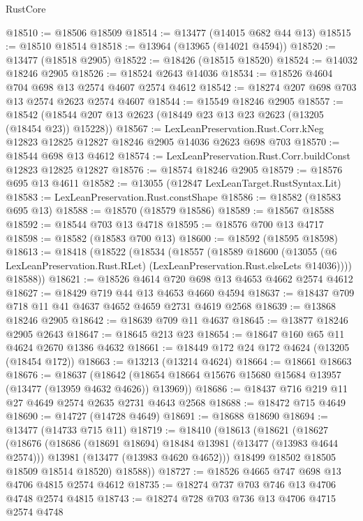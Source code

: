 \begin{lexlean}{RustCore}
\begin{coremodule}
@18510 := @18506 @18509
@18514 := @13477 (@14015 @682 @44 @13)
@18515 := @18510 @18514
@18518 := @13964 (@13965 (@14021 @4594))
@18520 := @13477 (@18518 @2905)
@18522 := @18426 (@18515 @18520)
@18524 := @14032 @18246 @2905
@18526 := @18524 @2643 @14036
@18534 := @18526 @4604 @704 @698 @13 @2574 @4607 @2574 @4612
@18542 := @18274 @207 @698 @703 @13 @2574 @2623 @2574 @4607
@18544 := @15549 @18246 @2905
@18557 := @18542 (@18544 @207 @13 @2623 (@18449 @23 @13 @23 @2623 (@13205 (@18454 @23)) @15228))
@18567 := LexLeanPreservation.Rust.Corr.kNeg
    @12823
    @12825
    @12827
    @18246
    @2905
    @14036
    @2623
    @698
    @703
@18570 := @18544 @698 @13 @4612
@18574 := LexLeanPreservation.Rust.Corr.buildConst @12823 @12825 @12827
@18576 := @18574 @18246 @2905
@18579 := @18576 @695 @13 @4611
@18582 := @13055 (@12847 LexLeanTarget.RustSyntax.Lit)
@18583 := LexLeanPreservation.Rust.constShape
@18586 := @18582 (@18583 @695 @13)
@18588 := @18570 (@18579 @18586)
@18589 := @18567 @18588
@18592 := @18544 @703 @13 @4718
@18595 := @18576 @700 @13 @4717
@18598 := @18582 (@18583 @700 @13)
@18600 := @18592 (@18595 @18598)
@18613 := @18418
    (@18522
      (@18534
        (@18557
          (@18589
            @18600
            (@13055 (@6 LexLeanPreservation.Rust.RLet) (LexLeanPreservation.Rust.elseLets @14036))))
        @18588))
@18621 := @18526 @4614 @720 @698 @13 @4653 @4662 @2574 @4612
@18627 := @18429 @719 @44 @13 @4653 @4660 @4594
@18637 := @18437 @709 @718 @11 @41 @4637 @4652 @4659 @2731 @4619 @2568
@18639 := @13868 @18246 @2905
@18642 := @18639 @709 @11 @4637
@18645 := @13877 @18246 @2905 @2643
@18647 := @18645 @213 @23
@18654 := @18647 @160 @65 @11 @4624 @2670 @1386 @4632
@18661 := @18449 @172 @24 @172 @4624 (@13205 (@18454 @172))
@18663 := @13213 (@13214 @4624)
@18664 := @18661 @18663
@18676 := @18637
    (@18642 (@18654 @18664 @15676 @15680 @15684 @13957 (@13477 (@13959 @4632 @4626)) @13969))
@18686 := @18437 @716 @219 @11 @27 @4649 @2574 @2635 @2731 @4643 @2568
@18688 := @18472 @715 @4649
@18690 := @14727 (@14728 @4649)
@18691 := @18688 @18690
@18694 := @13477 (@14733 @715 @11)
@18719 := @18410
    (@18613
      (@18621
        (@18627
          (@18676
            (@18686 (@18691 @18694) @18484 @13981 (@13477 (@13983 @4644 @2574)))
            @13981
            (@13477 (@13983 @4620 @4652)))
          @18499
          @18502
          @18505
          @18509
          @18514
          @18520)
        @18588))
@18727 := @18526 @4665 @747 @698 @13 @4706 @4815 @2574 @4612
@18735 := @18274 @737 @703 @746 @13 @4706 @4748 @2574 @4815
@18743 := @18274 @728 @703 @736 @13 @4706 @4715 @2574 @4748

\end{coremodule}
\end{lexlean}
